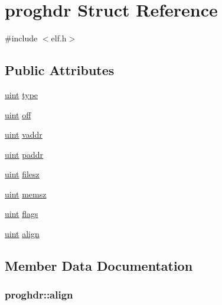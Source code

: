 \hypertarget{structproghdr}{}\section{proghdr Struct Reference}
\label{structproghdr}


{\ttfamily \#include $<$elf.\+h$>$}

\subsection*{Public Attributes}
\begin{DoxyCompactItemize}
\item 
\hyperlink{types_8h_a91ad9478d81a7aaf2593e8d9c3d06a14}{uint} \hyperlink{structproghdr_a42ea22dcdaa75a9cbdf7cd366b85e9ea}{type}
\item 
\hyperlink{types_8h_a91ad9478d81a7aaf2593e8d9c3d06a14}{uint} \hyperlink{structproghdr_a979532386fd448596cc5046339a2cd2d}{off}
\item 
\hyperlink{types_8h_a91ad9478d81a7aaf2593e8d9c3d06a14}{uint} \hyperlink{structproghdr_a6fa1051e19935bbedc5eaf086f5330b4}{vaddr}
\item 
\hyperlink{types_8h_a91ad9478d81a7aaf2593e8d9c3d06a14}{uint} \hyperlink{structproghdr_af65905aa5c4ccb33aac7dad5783e14d9}{paddr}
\item 
\hyperlink{types_8h_a91ad9478d81a7aaf2593e8d9c3d06a14}{uint} \hyperlink{structproghdr_a95dee0f1864ec1602f1ff6998ac00df0}{filesz}
\item 
\hyperlink{types_8h_a91ad9478d81a7aaf2593e8d9c3d06a14}{uint} \hyperlink{structproghdr_a9f703ade191af1054b3de797d8167d89}{memsz}
\item 
\hyperlink{types_8h_a91ad9478d81a7aaf2593e8d9c3d06a14}{uint} \hyperlink{structproghdr_ab3ad45ccf4b38dec384206ecbd099076}{flags}
\item 
\hyperlink{types_8h_a91ad9478d81a7aaf2593e8d9c3d06a14}{uint} \hyperlink{structproghdr_a9a7d455ad6830cd1a37aa324911880ec}{align}
\end{DoxyCompactItemize}


\subsection{Member Data Documentation}
\subsubsection[{\texorpdfstring{align}{align}}]{ proghdr\+::align}\hypertarget{structproghdr_a9a7d455ad6830cd1a37aa324911880ec}{}\label{structproghdr_a9a7d455ad6830cd1a37aa324911880ec}
